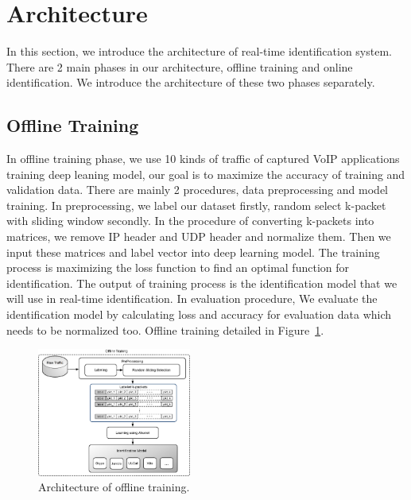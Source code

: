 \documentclass[conference]{IEEEtran}
\begin{document}
\section{Architecture}
\label{sec:architecture}
In this section, we introduce the architecture of real-time identification system. There are 2 main phases in our architecture, offline training and online identification. We introduce the architecture of these two phases separately.

\subsection{Offline Training}
In offline training phase, we use 10 kinds of traffic of captured VoIP applications training deep leaning model, our goal is to maximize the accuracy of training and validation data. There are mainly 2 procedures, data preprocessing and model training. In preprocessing, we label our dataset firstly, random select k-packet with sliding window secondly. In the procedure of converting k-packets into matrices, we remove IP header and UDP header and normalize them. Then we input these matrices and label vector into deep learning model. The training process is maximizing the loss function to find an optimal function for identification. The output of training process is the identification model that we will use in real-time identification. In evaluation procedure, We evaluate the identification model by calculating loss and accuracy for evaluation data which needs to be normalized too. Offline training detailed in Figure~\ref{fig:offline_architecture.eps}.

\begin{figure}[htp]
\begin{center}
\includegraphics[width=0.45\textwidth]{offline_architecture.eps}
\caption{Architecture of offline training.}\label{fig:offline_architecture.eps}
\end{center}
\end{figure}
\end{document}
